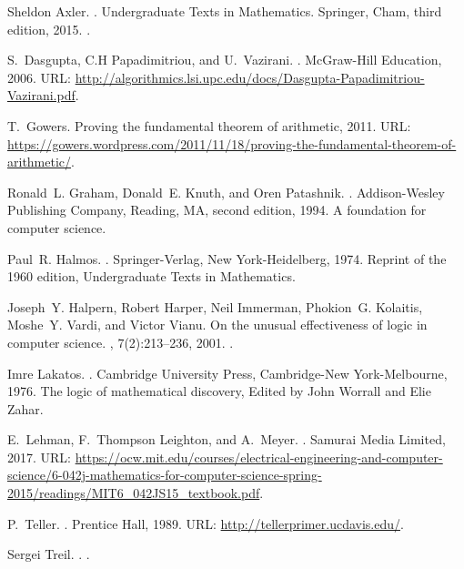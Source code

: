 \documentclass{article}
\theoremstyle{plain}
\numberwithin{theorem}{subsection}
\begin{document}
\begin{thebibliography}{10}

Sheldon Axler.
.
\newblock Undergraduate Texts in Mathematics. Springer, Cham, third edition,
  2015.
\newblock \href {https://doi.org/10.1007/978-3-319-11080-6}
  {}.

S.~Dasgupta, C.H Papadimitriou, and U.~Vazirani.
.
\newblock McGraw-Hill Education, 2006.
\newblock URL:
  \url{http://algorithmics.lsi.upc.edu/docs/Dasgupta-Papadimitriou-Vazirani.pdf}.

T.~Gowers.
\newblock Proving the fundamental theorem of arithmetic, 2011.
\newblock URL:
  \url{https://gowers.wordpress.com/2011/11/18/proving-the-fundamental-theorem-of-arithmetic/}.

Ronald~L. Graham, Donald~E. Knuth, and Oren Patashnik.
.
\newblock Addison-Wesley Publishing Company, Reading, MA, second edition, 1994.
\newblock A foundation for computer science.

Paul~R. Halmos.
.
\newblock Springer-Verlag, New York-Heidelberg, 1974.
\newblock Reprint of the 1960 edition, Undergraduate Texts in Mathematics.

Joseph~Y. Halpern, Robert Harper, Neil Immerman, Phokion~G. Kolaitis, Moshe~Y.
  Vardi, and Victor Vianu.
\newblock On the unusual effectiveness of logic in computer science.
, 7(2):213--236, 2001.
\newblock \href {https://doi.org/10.2307/2687775} {}.

Imre Lakatos.
.
\newblock Cambridge University Press, Cambridge-New York-Melbourne, 1976.
\newblock The logic of mathematical discovery, Edited by John Worrall and Elie
  Zahar.

E.~Lehman, F.~Thompson Leighton, and A.~Meyer.
.
\newblock Samurai Media Limited, 2017.
\newblock URL:
  \url{https://ocw.mit.edu/courses/electrical-engineering-and-computer-science/6-042j-mathematics-for-computer-science-spring-2015/readings/MIT6_042JS15_textbook.pdf}.

P.~Teller.
.
\newblock Prentice Hall, 1989.
\newblock URL: \url{http://tellerprimer.ucdavis.edu/}.

Sergei Treil.
.
.

\end{thebibliography}
\end{document}
